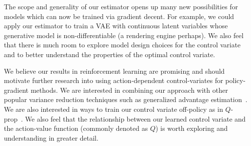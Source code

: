 \documentclass{article}
\begin{document}

The scope and generality of our estimator opens up many new possibilities for models which can now be trained via gradient decent.
For example, we could apply our estimator to train a VAE with continuous latent variables whose generative model is non-differentiable (a rendering engine perhaps).
We also feel that there is much room to explore model design choices for the control variate and to better understand the properties of the optimal control variate. 

We believe our results in reinforcement learning are promising and should motivate further research into using action-dependent control-variates for policy-gradient methods.
We are interested in combining our approach with other popular variance reduction techniques such as generalized advantage estimation~\citep{kimura2000analysis}.
We are also interested in ways to train our control variate off-policy as in $Q$-prop~\citep{gu2016q}.
We also feel that the relationship between our learned control variate and the action-value function (commonly denoted as $Q$) is worth exploring and understanding in greater detail.







\end{document}
